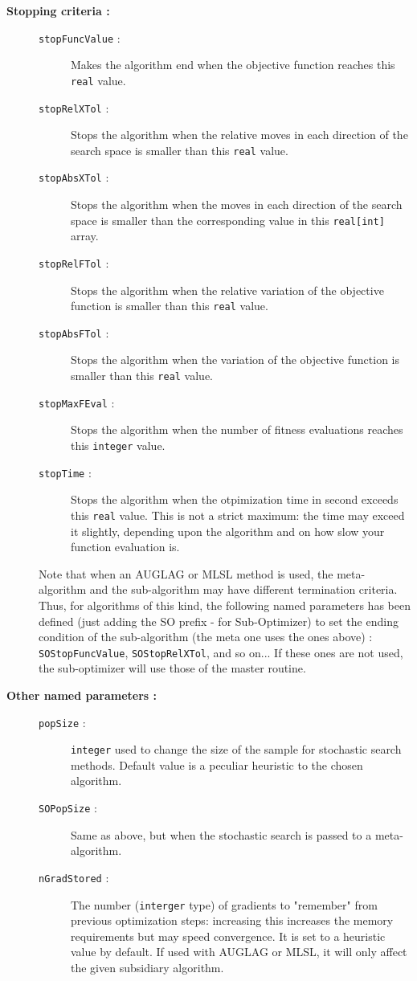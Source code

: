 \documentclass[a4paper,twoside,12pt]{book}
\begin{document}
\begin{description}
\item[\textbf{Stopping criteria :}]
\begin{description}
  \item[ ]
  \item[\texttt{stopFuncValue} :] Makes the algorithm end when the objective function reaches this {\tt real} value.
  \item[\texttt{stopRelXTol} :] Stops the algorithm when the relative moves in each direction of the search space is smaller than this {\tt real} value.
  \item[\texttt{stopAbsXTol} :] Stops the algorithm when the moves in each direction of the search space is smaller than the corresponding value in this {\tt real[int]} array.
  \item[\texttt{stopRelFTol} :] Stops the algorithm when the relative variation of the objective function is smaller than this {\tt real} value.
  \item[\texttt{stopAbsFTol} :] Stops the algorithm when the variation of the objective function is smaller than this {\tt real} value.
  \item[\texttt{stopMaxFEval} :] Stops the algorithm when the number of fitness evaluations reaches this {\tt integer} value.
  \item[\texttt{stopTime} :] Stops the algorithm when the otpimization time in second exceeds this {\tt real} value. This is not a strict maximum: the time may exceed it slightly, 
  depending upon the algorithm and on how slow your function evaluation is.
 \end{description}
 Note that when an AUGLAG or MLSL method is used, the meta-algorithm and the sub-algorithm may have different termination criteria. Thus, for algorithms of this kind, the following
 named parameters has been defined (just adding the SO prefix - for Sub-Optimizer) to set the ending condition of the sub-algorithm (the meta one uses the ones above) : {\tt SOStopFuncValue}, 
 {\tt SOStopRelXTol}, and so on... If these ones are not used, the sub-optimizer will use those of the master routine.
 
 \item[\textbf{Other named parameters :}]
 \begin{description}
   \item[ ]
   \item[\texttt{popSize} :] {\tt integer} used to change the size of the sample for stochastic search methods. Default value is a peculiar heuristic to the chosen algorithm.
   \item[\texttt{SOPopSize} :] Same as above, but when the stochastic search is passed to a meta-algorithm.
   \item[\texttt{nGradStored} :] The number ({\tt interger} type) of gradients to "remember" from previous optimization steps: increasing this increases the memory requirements but may speed convergence.
   It is set to a heuristic value by default. If used with AUGLAG or MLSL, it will only affect the given subsidiary algorithm.
 \end{description}

\end{description}
\end{document}
